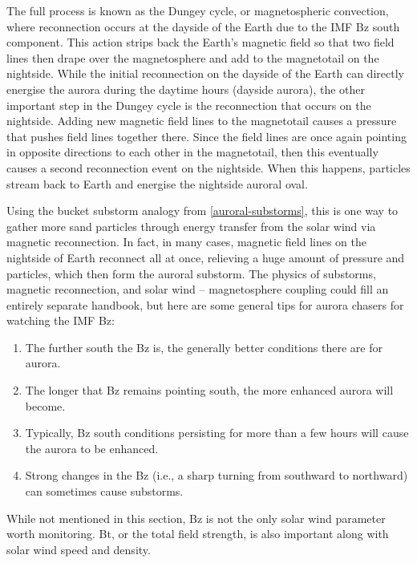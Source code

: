 \documentclass{article}
\begin{document}
The full process is known as the Dungey cycle, or magnetospheric convection, where reconnection occurs at the dayside of the Earth due to the IMF Bz south component. This action strips back the Earth's magnetic field so that two field lines then drape over the magnetosphere and add to the magnetotail on the nightside. While the initial reconnection on the dayside of the Earth can directly energise the aurora during the daytime hours (dayside aurora), the other important step in the Dungey cycle is the reconnection that occurs on the nightside. Adding new magnetic field lines to the magnetotail causes a pressure that pushes field lines together there. Since the field lines are once again pointing in opposite directions to each other in the magnetotail, then this eventually causes a second reconnection event on the nightside. When this happens, particles stream back to Earth and energise the nightside auroral oval.

Using the bucket substorm analogy from \ref{auroral-substorms}, this is one way to gather more sand particles through energy transfer from the solar wind via magnetic reconnection. In fact, in many cases, magnetic field lines on the nightside of Earth reconnect all at once, relieving a huge amount of pressure and particles, which then form the auroral substorm.
The physics of substorms, magnetic reconnection, and solar wind -- magnetosphere coupling could fill an entirely separate handbook, but here are some general tips for aurora chasers for watching the IMF Bz:
\begin{enumerate}
    \item The further south the Bz is, the generally better conditions there are for aurora.
    \item The longer that Bz remains pointing south, the more enhanced aurora will become.
    \item Typically, Bz south conditions persisting for more than a few hours will cause the aurora to be enhanced.
    \item Strong changes in the Bz (i.e., a sharp turning from southward to northward) can sometimes cause substorms.
\end{enumerate}

While not mentioned in this section, Bz is not the only solar wind parameter worth monitoring. Bt, or the total field strength, is also important along with solar wind speed and density.
\end{document}
